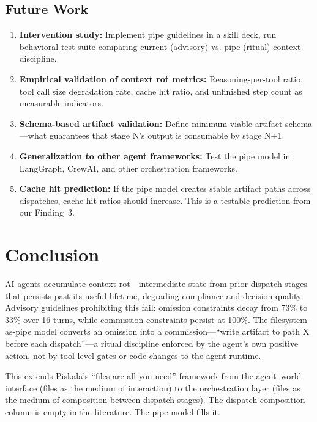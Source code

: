 \documentclass[11pt,a4paper]{article}
\begin{document}
\subsection{Future Work}
\label{sec:future}
\begin{enumerate}[nosep]
  \item \textbf{Intervention study:} Implement pipe guidelines in a skill deck, run behavioral test suite comparing current (advisory) vs. pipe (ritual) context discipline.
  \item \textbf{Empirical validation of context rot metrics:} Reasoning-per-tool ratio, tool call size degradation rate, cache hit ratio, and unfinished step count as measurable indicators.
  \item \textbf{Schema-based artifact validation:} Define minimum viable artifact schema---what guarantees that stage N's output is consumable by stage N+1.
  \item \textbf{Generalization to other agent frameworks:} Test the pipe model in LangGraph, CrewAI, and other orchestration frameworks.
  \item \textbf{Cache hit prediction:} If the pipe model creates stable artifact paths across dispatches, cache hit ratios should increase. This is a testable prediction from our Finding~3.
\end{enumerate}

\section{Conclusion}
\label{sec:conclusion}

AI agents accumulate context rot---intermediate state from prior dispatch stages that persists past its useful lifetime, degrading compliance and decision quality. Advisory guidelines prohibiting this fail: omission constraints decay from 73\% to 33\% over 16 turns, while commission constraints persist at 100\%. The filesystem-as-pipe model converts an omission into a commission---``write artifact to path X before each dispatch''---a ritual discipline enforced by the agent's own positive action, not by tool-level gates or code changes to the agent runtime.

This extends Piskala's ``files-are-all-you-need'' framework from the agent--world interface (files as the medium of interaction) to the orchestration layer (files as the medium of composition between dispatch stages). The dispatch composition column is empty in the literature. The pipe model fills it.
\end{document}
